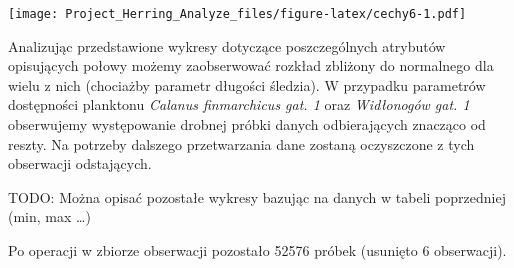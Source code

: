 \documentclass[]{article}
\newenvironment{Shaded}{\begin{snugshade}}{\end{snugshade}}
\newcommand{\DecValTok}[1]{\textcolor[rgb]{0.00,0.00,0.81}{#1}}
\newcommand{\KeywordTok}[1]{\textcolor[rgb]{0.13,0.29,0.53}{\textbf{#1}}}
\newcommand{\NormalTok}[1]{#1}
\newcommand{\OperatorTok}[1]{\textcolor[rgb]{0.81,0.36,0.00}{\textbf{#1}}}
\newcommand{\StringTok}[1]{\textcolor[rgb]{0.31,0.60,0.02}{#1}}
\begin{document}
\texttt{[image: Project\_Herring\_Analyze\_files/figure-latex/cechy6-1.pdf]}

Analizując przedstawione wykresy dotyczące poszczególnych atrybutów
opisujących połowy możemy zaobserwować rozkład zbliżony do normalnego
dla wielu z nich (chociażby parametr długości śledzia). W przypadku
parametrów dostępności planktonu \emph{Calanus finmarchicus gat. 1} oraz
\emph{Widłonogów gat. 1} obserwujemy występowanie drobnej próbki danych
odbierających znacząco od reszty. Na potrzeby dalszego przetwarzania
dane zostaną oczyszczone z tych obserwacji odstających.

TODO: Można opisać pozostałe wykresy bazując na danych w tabeli
poprzedniej (min, max \ldots{})

\begin{Shaded}
\end{Shaded}

Po operacji w zbiorze obserwacji pozostało 52576 próbek (usunięto 6
obserwacji).
\end{document}
